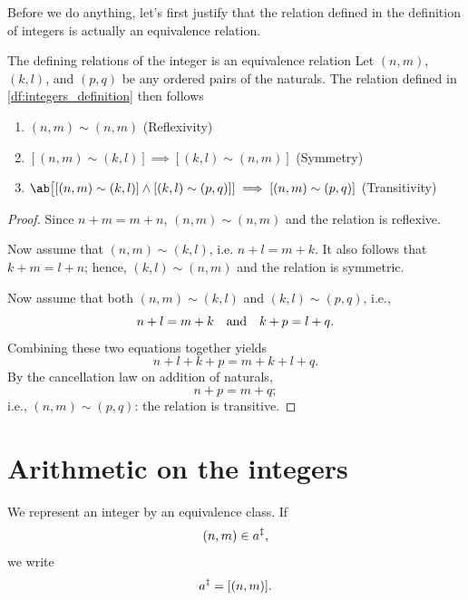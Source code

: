 Before we do anything, let's first justify that the relation defined in the definition of integers
is actually an equivalence relation.

\begin{prop}{The defining relations of the integer is an equivalence relation}{}
  Let \((n, m)\), \((k, l)\), and \((p, q)\) be any ordered pairs of the naturals. The relation
  defined in \cref{df:integers_definition} then follows
  \begin{enumerate}[noitemsep]
    \item \((n, m) \sim (n, m)\) (Reflexivity)
    \item \([(n, m) \sim (k, l)] \implies [(k, l) \sim (n, m)]\) (Symmetry)
    \item \(\ab\big[[(n, m) \sim (k, l)] \land [(k, l) \sim (p, q)]] \implies [(n, m) \sim (p, q)]\)
          (Transitivity)
  \end{enumerate}
\end{prop}

\begin{proof}
  Since \(n + m = m + n\), \((n, m) \sim (n, m)\) and the relation is reflexive.

  Now assume that \((n, m) \sim (k, l)\), i.e. \(n + l = m + k\). It also follows that
  \(k + m = l + n\); hence, \((k, l) \sim (n, m)\) and the relation is symmetric.

  Now assume that both \((n, m) \sim (k, l)\) and \((k, l) \sim (p, q)\), i.e.,
  \begin{equation}
    n + l = m + k \quad\textrm{and}\quad k + p = l + q.
  \end{equation}
  Combining these two equations together yields
  \begin{equation}
    n + l + k + p = m + k + l + q.
  \end{equation}
  By the cancellation law on addition of naturals,
  \begin{equation}
    n + p = m + q;
  \end{equation}
  i.e., \((n, m) \sim (p, q)\): the relation is transitive.
\end{proof}

\section{Arithmetic on the integers}

We represent an integer by an equivalence class. If
\begin{equation}
  (n, m) \in a^{\ddagger},
\end{equation}
we write
\begin{equation}
  a^{\ddagger} = [(n, m)].
\end{equation}


